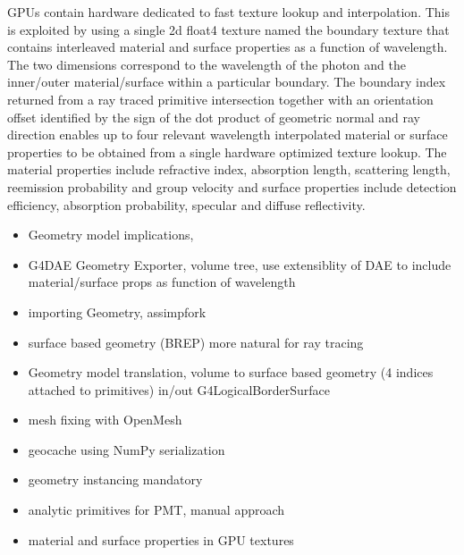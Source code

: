 \documentclass[a4paper]{jpconf}
\begin{document}
GPUs contain hardware dedicated to fast texture lookup and interpolation. 
This is exploited by using a single 2d float4 texture named the boundary texture 
that contains interleaved material and surface properties as a function of wavelength. 
The two dimensions correspond to the wavelength of the photon and the inner/outer material/surface 
within a particular boundary. 
The boundary index returned from a ray traced primitive intersection together with 
an orientation offset identified by the sign of the dot product of geometric normal and ray direction 
enables up to four relevant wavelength interpolated material or surface properties to be 
obtained from a single hardware optimized texture lookup.
The material properties include refractive index, absorption length, scattering length, reemission probability and  group velocity
and surface properties include detection efficiency, absorption probability, specular and diffuse reflectivity.




%
%
% 
%
% 
% 

\begin{itemize}
\item Geometry model implications, 
\item G4DAE Geometry Exporter, volume tree, use extensiblity of DAE to include material/surface props as function of wavelength
\item importing Geometry, assimpfork \cite{Assimp} \cite{AssimpFork}
\item surface based geometry (BREP) more natural for ray tracing 
\item Geometry model translation, volume to surface based geometry (4 indices attached to primitives) in/out G4LogicalBorderSurface
\item mesh fixing with OpenMesh\cite{OpenMesh}
\item geocache using NumPy serialization
\item geometry instancing mandatory
\item analytic primitives for PMT, manual approach 
\item material and surface properties in GPU textures
\end{itemize}
\end{document}
